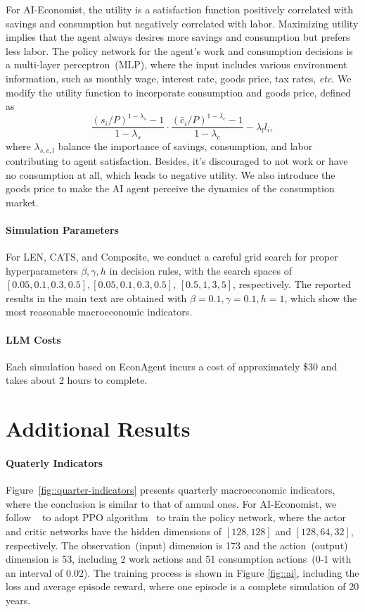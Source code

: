For AI-Economist, the utility is a satisfaction function positively correlated with savings and consumption but negatively correlated with labor. Maximizing utility implies that the agent always desires more savings and consumption but prefers less labor. The policy network for the agent's work and consumption decisions is a multi-layer perceptron~(MLP), where the input includes various environment information, such as monthly wage, interest rate, goods price, tax rates, \textit{etc}. We modify the utility function to incorporate consumption and goods price, defined as
\begin{equation}
    \frac{(s_i/P)^{1-\lambda_s}-1}{1-\lambda_s}\cdot \frac{(\hat{c}_i/P)^{1-\lambda_c}-1}{1-\lambda_c} - \lambda_l l_i,
\end{equation}
where $\lambda_{s,c,l}$ balance the importance of savings, consumption, and labor contributing to agent satisfaction. Besides, it's discouraged to not work or have no consumption at all, which leads to negative utility. We also introduce the goods price to make the AI agent perceive the dynamics of the consumption market.

\paragraph{Simulation Parameters} For LEN, CATS, and Composite, we conduct a careful grid search for proper hyperparameters $\beta, \gamma, h$ in decision rules, with the search spaces of $[0.05, 0.1, 0.3, 0.5], [0.05, 0.1, 0.3, 0.5]$, $[0.5, 1, 3, 5]$, respectively. The reported results in the main text are obtained with $\beta=0.1, \gamma=0.1, h=1$, which show the most reasonable macroeconomic indicators.

\paragraph{LLM Costs} Each simulation based on EconAgent incurs a cost of approximately \$30 and takes about 2 hours to complete.

\section{Additional Results} 

\paragraph{Quaterly Indicators} Figure~\ref{fig::quarter-indicators} presents quarterly macroeconomic indicators, where the conclusion is similar to that of annual ones. For AI-Economist, we follow ~\cite{zheng2022ai} to adopt PPO algorithm~\cite{schulman2017proximal} to train the policy network, where the actor and critic networks have the hidden dimensions of $[128, 128]$ and $[128, 64, 32]$, respectively. The observation~(input) dimension is 173 and the action~(output) dimension is 53, including 2 work actions and 51 consumption actions~(0-1 with an interval of 0.02). The training process is shown in Figure \ref{fig::ai}, including the loss and average episode reward, where one episode is a complete simulation of 20 years.

